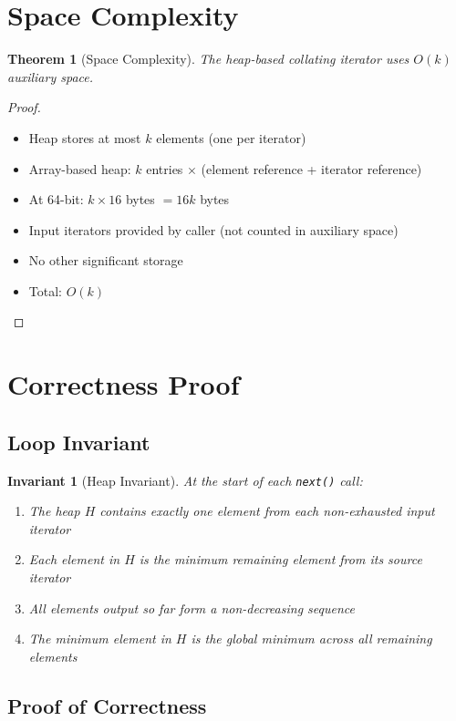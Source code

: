 \documentclass[11pt]{article}
\newtheorem{theorem}{Theorem}
\newtheorem{invariant}{Invariant}
\begin{document}
\section{Space Complexity}

\begin{theorem}[Space Complexity]
The heap-based collating iterator uses $O(k)$ auxiliary space.
\end{theorem}

\begin{proof}
\begin{itemize}
    \item Heap stores at most $k$ elements (one per iterator)
    \item Array-based heap: $k$ entries $\times$ (element reference + iterator reference)
    \item At 64-bit: $k \times 16$ bytes $= 16k$ bytes
    \item Input iterators provided by caller (not counted in auxiliary space)
    \item No other significant storage
    \item Total: $O(k)$
\end{itemize}
\end{proof}

\section{Correctness Proof}

\subsection{Loop Invariant}

\begin{invariant}[Heap Invariant]
At the start of each \texttt{next()} call:
\begin{enumerate}
    \item The heap $H$ contains exactly one element from each non-exhausted input iterator
    \item Each element in $H$ is the minimum remaining element from its source iterator
    \item All elements output so far form a non-decreasing sequence
    \item The minimum element in $H$ is the global minimum across all remaining elements
\end{enumerate}
\end{invariant}

\subsection{Proof of Correctness}
\end{document}
